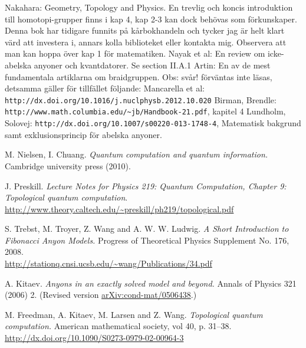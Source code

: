\documentclass[a4paper,10pt,oneside]{book}
\theoremstyle{plain}
\theoremstyle{definition}
\theoremstyle{remark}
\begin{document}
{\begin{thebibliography}{99}
   Nakahara: Geometry, Topology and Physics. En trevlig och koncis introduktion till homotopi-grupper finns i kap 4, kap 2-3 kan dock behövas som förkunskaper. Denna bok har tidigare funnits på kårbokhandeln och tycker jag är helt klart värd att investera i, annars kolla biblioteket eller kontakta mig. Observera att man kan hoppa över kap 1 för matematiken.
   Nayak et al: En review om icke-abelska anyoner och kvantdatorer. Se section II.A.1
   Artin: En av de mest fundamentala artiklarna om braidgruppen. Obs: svår! förväntas inte läsas, detsamma gäller för tillfället följande:
   Mancarella et al: \verb|http://dx.doi.org/10.1016/j.nuclphysb.2012.10.020|
   Birman, Brendle: \verb|http://www.math.columbia.edu/~jb/Handbook-21.pdf|, kapitel 4
   Lundholm, Solovej: \verb|http://dx.doi.org/10.1007/s00220-013-1748-4|, Matematisk bakgrund samt exklusionsprincip för abelska anyoner.

    M. Nielsen, I. Chuang.
    \textit{Quantum computation and quantum information.}
    Cambridge university press (2010).

    J. Preskill.
    \textit{Lecture Notes for Physics 219: Quantum Computation, Chapter 9: Topological quantum computation}.
    \\
    \url{http://www.theory.caltech.edu/~preskill/ph219/topological.pdf}

    S. Trebst, M. Troyer, Z. Wang and A. W. W. Ludwig.
    \textit{A Short Introduction to Fibonacci Anyon Models.}
    Progress of Theoretical Physics Supplement No. 176, 2008.
    \\
    \url{http://stationq.cnsi.ucsb.edu/~wang/Publications/34.pdf}

    A. Kitaev.
    \textit{Anyons in an exactly solved model and beyond.}
    Annals of Physics 321 (2006) 2.
    (Revised version \href{https://arxiv.org/abs/cond-mat/0506438}{arXiv:cond-mat/0506438}.)
    \\

    M. Freedman, A. Kitaev, M. Larsen and Z. Wang.
    \textit{Topological quantum computation.}
    American mathematical society, vol 40, p. 31–38.
    \\
    \url{http://dx.doi.org/10.1090/S0273-0979-02-00964-3}


\end{thebibliography}}
\end{document}
